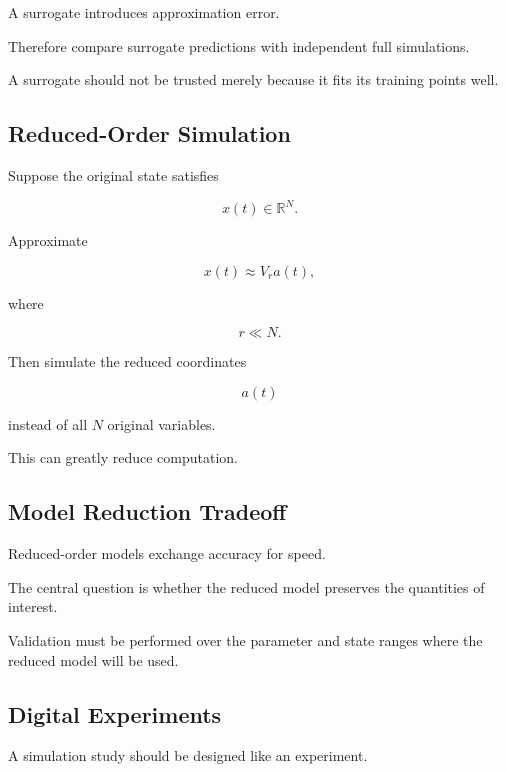 A surrogate introduces approximation error.

Therefore compare surrogate predictions with independent full simulations.

A surrogate should not be trusted merely because it fits its training
points well.

\subsection{Reduced-Order Simulation}
\label{subsec:reduced-order-simulation}

Suppose the original state satisfies

\[
x(t)
\in
\mathbb{R}^N.
\]

Approximate

\[
\boxed{
x(t)
\approx
V_r a(t),
}
\]

where

\[
r\ll N.
\]

Then simulate the reduced coordinates

\[
a(t)
\]

instead of all \(N\) original variables.

This can greatly reduce computation.

\subsection{Model Reduction Tradeoff}
\label{subsec:model-reduction-tradeoff}

Reduced-order models exchange accuracy for speed.

The central question is whether the reduced model preserves the quantities
of interest.

Validation must be performed over the parameter and state ranges where the
reduced model will be used.

\subsection{Digital Experiments}
\label{subsec:digital-experiments}

A simulation study should be designed like an experiment.

